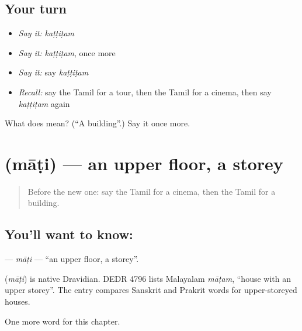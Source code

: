 \subsection*{Your turn}
\begin{itemize}
\raggedright
  \item \emph{Say it:} \emph{kaṭṭiṭam}
  \item \emph{Say it:} \emph{kaṭṭiṭam}, once more
  \item \emph{Say it:} say \emph{kaṭṭiṭam}
  \item \emph{Recall:} say the Tamil for a tour, then the Tamil for a cinema, then say \emph{kaṭṭiṭam} again
\end{itemize}

\begin{tcolorbox}[breakable,colback=teal!4,colframe=teal!35!black,title={Before you move on}]
What does  mean? (\textquotedblleft{}A building\textquotedblright{}.) Say it once more.
\end{tcolorbox}
\section[\texorpdfstring{\ta{மாடி} (māṭi)}{மாடி (māṭi)}]{ (māṭi) — an upper floor, a storey}

\label{lesson:TA-C205-mati}



\begin{quote}
Before the new one: say the Tamil for a cinema, then the Tamil for a building.
\end{quote}

\subsection*{You'll want to know: }
\textbf{} — \emph{māṭi} — \textquotedblleft{}an upper floor, a storey\textquotedblright{}.

\begin{cousinweb}
\textbf{} (\emph{māṭi}) is native Dravidian. DEDR 4796 lists Malayalam \emph{māṭam}, \textquotedblleft{}house with an upper storey\textquotedblright{}. The entry compares Sanskrit and Prakrit words for upper-storeyed houses.
\end{cousinweb}

\begin{grammarlens}[title={What you've built}]
One more word for this chapter.
\end{grammarlens}


